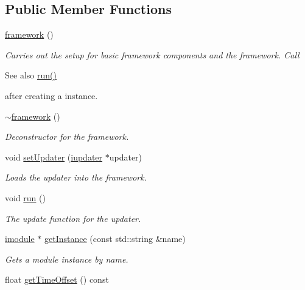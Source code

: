 \subsection*{Public Member Functions}
\begin{DoxyCompactItemize}
\item 
\hyperlink{classflounder_1_1framework_ae7f076f63f78093952477e83174120f9}{framework} ()
\begin{DoxyCompactList}\small\item\em Carries out the setup for basic framework components and the framework. Call \begin{DoxySeeAlso}{See also}
\hyperlink{classflounder_1_1framework_aa3a73c8e8f5f0c6ccef3e4de89982434}{run()}


\end{DoxySeeAlso}
after creating a instance. \end{DoxyCompactList}\item 
\hyperlink{classflounder_1_1framework_a4f5440b66d1c2e7e35d9dc7fd733f944}{$\sim$framework} ()
\begin{DoxyCompactList}\small\item\em Deconstructor for the framework. \end{DoxyCompactList}\item 
void \hyperlink{classflounder_1_1framework_abfa2c0da27ab46791ee7877115afffa3}{set\+Updater} (\hyperlink{classflounder_1_1iupdater}{iupdater} $\ast$updater)
\begin{DoxyCompactList}\small\item\em Loads the updater into the framework. \end{DoxyCompactList}\item 
void \hyperlink{classflounder_1_1framework_aa3a73c8e8f5f0c6ccef3e4de89982434}{run} ()
\begin{DoxyCompactList}\small\item\em The update function for the updater. \end{DoxyCompactList}\item 
\hyperlink{classflounder_1_1imodule}{imodule} $\ast$ \hyperlink{classflounder_1_1framework_a84a2314d26174ab02b48bcda8fd5b4e4}{get\+Instance} (const std\+::string \&name)
\begin{DoxyCompactList}\small\item\em Gets a module instance by name. \end{DoxyCompactList}\item 
float \hyperlink{classflounder_1_1framework_aa85d7cdc20c0f8b47aee5dff06d03ae3}{get\+Time\+Offset} () const

\end{DoxyCompactItemize}
